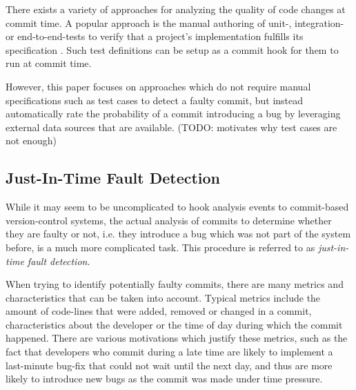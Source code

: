 There exists a variety of approaches for analyzing the quality of code changes at commit time. A popular approach is the manual authoring of unit-, integration- or end-to-end-tests to verify that a project's implementation fulfills its specification \cite{Maayan2018}. Such test definitions can be setup as a commit hook for them to run at commit time.

However, this paper focuses on approaches which do not require manual specifications such as test cases to detect a faulty commit, but instead automatically rate the probability of a commit introducing a bug by leveraging external data sources that are available. (TODO: \cite{Koyuncu2019} motivates why test cases are not enough)

\subsection{Just-In-Time Fault Detection}

While it may seem to be uncomplicated to hook analysis events to commit-based version-control systems, the actual analysis of commits to determine whether they are faulty or not, i.e. they introduce a bug which was not part of the system before, is a much more complicated task. This procedure is referred to as \textit{just-in-time fault detection}. \cite{Nayrolles2018, Kamei2013}

When trying to identify potentially faulty commits, there are many metrics and characteristics that can be taken into account. Typical metrics include the amount of code-lines that were added, removed or changed in a commit, characteristics about the developer or the time of day during which the commit happened. There are various motivations which justify these metrics, such as the fact that developers who commit during a late time are likely to implement a last-minute bug-fix that could not wait until the next day, and thus are more likely to introduce new bugs as the commit was made under time pressure. \cite{Goyal2017}

